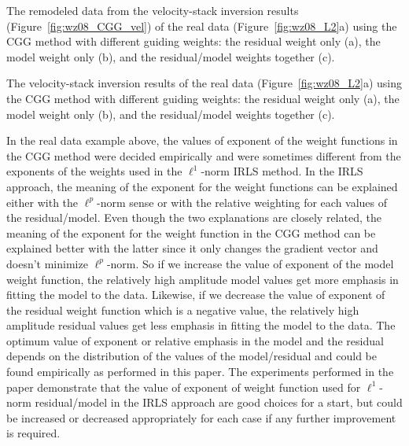 {The remodeled data from the velocity-stack inversion results (Figure~\protect\ref{fig:wz08_CGG_vel}) 
of the real data (Figure~\protect\ref{fig:wz08_L2}a) using the CGG method with
different guiding weights: the residual weight only (a), the model weight only (b),
and the residual/model weights together (c).}

{The velocity-stack inversion results of the real data (Figure~\protect\ref{fig:wz08_L2}a) 
using the CGG method with
different guiding weights: the residual weight only (a), the model weight only (b),
and the residual/model weights together (c).}

In the real data example above,
the values of exponent of the weight functions in the CGG method
were decided empirically and were sometimes different from the exponents of the weights 
used in the $\ell^1$-norm IRLS method.
In the IRLS approach, the meaning of the exponent for the weight functions
can be explained either with the $\ell^p$-norm sense or
with the relative weighting for each values of the residual/model.
Even though the two explanations are closely related, 
the meaning of the exponent for the weight function in the CGG method
can be explained better with the latter since it only
changes the gradient vector and doesn't minimize $\ell^p$-norm.
So if we increase the value of exponent of the model weight function, 
the relatively high amplitude model values get more emphasis 
in fitting the model to the data.
Likewise, if we decrease the value of exponent of the residual weight function
which is a negative value, the relatively high amplitude residual values get less emphasis
in fitting the model to the data.
The optimum value of exponent or relative emphasis in the model and the residual
depends on the distribution of the values of the model/residual
and could be found empirically as performed in this paper.
The experiments performed in the paper demonstrate
that the value of exponent of weight function used for $\ell^1$-norm residual/model in the IRLS approach 
are good choices for a start, but could be increased or decreased appropriately for each case
if any further improvement is required.

